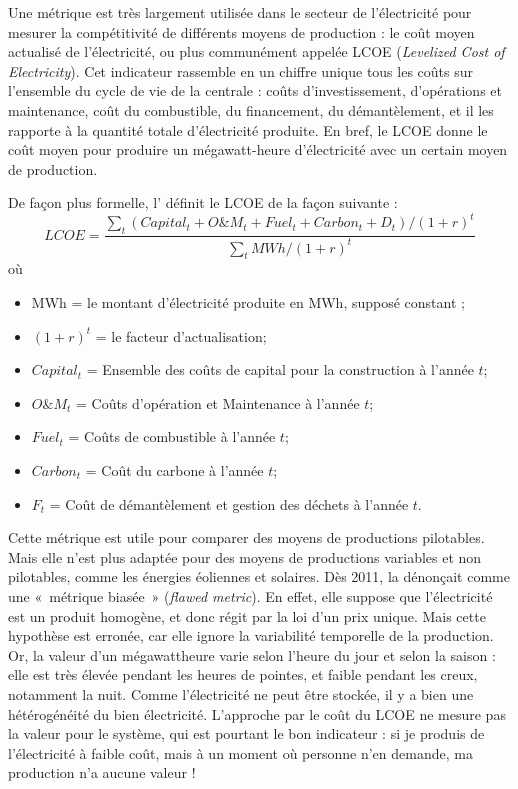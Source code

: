 Une métrique est très largement utilisée dans le secteur de l’électricité pour mesurer la compétitivité de différents moyens de production : le coût moyen actualisé de l’électricité, ou plus communément appelée LCOE (\textit{Levelized Cost of Electricity}).
Cet indicateur rassemble en un chiffre unique tous les coûts sur l’ensemble du cycle de vie de la centrale : coûts d’investissement, d’opérations et maintenance, coût du combustible, du financement, du démantèlement, et il les rapporte à la quantité totale d’électricité produite. En bref, le LCOE donne le coût moyen pour produire un mégawatt-heure d’électricité avec un certain moyen de production.

De façon plus formelle, l’\citet{InternationalEnergyAgency2015} définit le LCOE de la façon suivante :
$$LCOE = \frac{\sum_t (Capital_t + O\&M_t + Fuel_t + Carbon_t + D_t) / (1+r)^t}{\sum_t MWh / (1+r)^t}$$
où
\begin{itemize}
	\item MWh = le montant d'électricité produite en MWh, supposé constant ;
	\item $(1+r)^t$ = le facteur d'actualisation;
	\item $Capital_t$ = Ensemble des coûts de capital pour la construction à l'année $t$;
	\item $O\&M_t$ = Coûts d'opération et Maintenance à l'année $t$;
	\item $Fuel_t$  = Coûts de combustible à l'année $t$;
	\item $Carbon_t$ = Coût du carbone à l'année $t$;
	\item $F_t$ = Coût de démantèlement et gestion des déchets à l'année $t$.
\end{itemize}

Cette métrique est utile pour comparer des moyens de productions pilotables. Mais elle n’est plus adaptée pour des moyens de productions variables et non pilotables, comme les énergies éoliennes et solaires. Dès 2011, \citet{Joskow2011a} la dénonçait comme une  «~métrique biasée~» (\textit{flawed metric}). En effet, elle suppose que l’électricité est un produit homogène, et donc régit par la loi d’un prix unique. Mais cette hypothèse est erronée, car elle ignore la variabilité temporelle de la production. Or, la valeur d’un mégawattheure varie selon l’heure du jour et selon la saison : elle est très élevée pendant les heures de pointes, et faible pendant les creux, notamment la nuit. Comme l’électricité ne peut être stockée, il y a bien une hétérogénéité du bien électricité. L’approche par le coût du LCOE ne mesure pas la valeur pour le système, qui est pourtant le bon indicateur : si je produis de l’électricité à faible coût, mais à un moment où personne n’en demande, ma production n’a aucune valeur !


